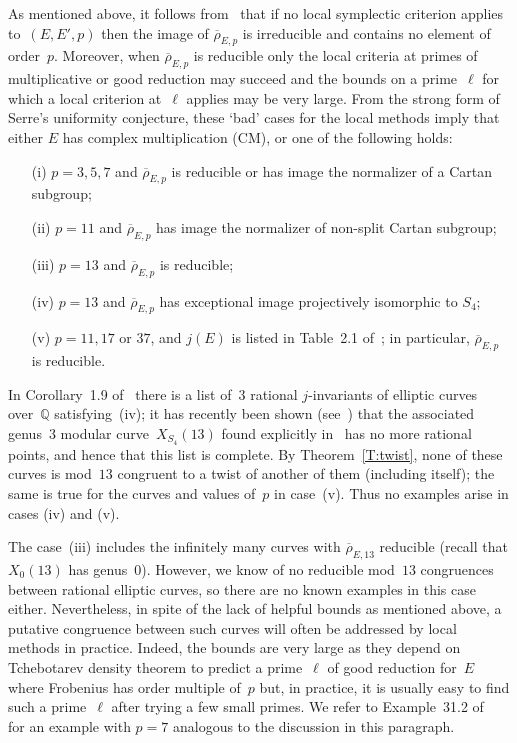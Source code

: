 \documentclass[twoside,leqno,symbols-for-thanks, draft]{rmi}
\numberwithin{equation}{section}
\newcommand{\Q}{\mathbb{Q}}
\newcommand{\rhobar}{{\overline{\rho}}}
\theoremstyle{remark}
\begin{document}
As mentioned above, it follows from~\cite{FKSym} that if no local
symplectic criterion applies to~$(E,E',p)$ then the image of
$\rhobar_{E,p}$ is irreducible and contains no element of
order~$p$. Moreover, when $\rhobar_{E,p}$ is reducible
only the local criteria at primes of multiplicative or good reduction may
succeed and the bounds on a prime~$\ell$ for which a local
criterion at~$\ell$ applies may be very large.  From the
strong form of Serre's uniformity conjecture, these `bad' cases for
the local methods imply that either $E$ has complex multiplication
(CM), or one of the following holds:
\begin{itemize}
 \item[(i)] $p=3,5,7$ and $\rhobar_{E,p}$ is reducible or has image the normalizer of a Cartan subgroup;
 \item[(ii)] $p=11$ and $\rhobar_{E,p}$ has image the normalizer of non-split Cartan subgroup;
 \item[(iii)] $p=13$ and $\rhobar_{E,p}$ is reducible; 
 \item[(iv)] $p=13$ and $\rhobar_{E,p}$ has exceptional image projectively isomorphic to $S_4$;
 \item[(v)] $p=11,17$ or $37$, and $j(E)$ is listed
 in Table~2.1 of~\cite{DahmenPhD}; in particular, $\rhobar_{E,p}$ is reducible.
\end{itemize}
In Corollary~1.9 of~\cite{BarinderCrem} there is a list of~$3$ rational
$j$-invariants of elliptic curves over~$\Q$ satisfying~(iv); it has
recently been shown (see~\cite{BDMTV-S4}) that the associated
genus~$3$ modular curve~$X_{S_4}(13)$ found explicitly
in~\cite{BarinderCrem} has no more rational points, and hence that
this list is complete. By Theorem~\ref{T:twist}, none of these
curves is mod~$13$ congruent to a twist of another of them
(including itself); the same is true for the curves and values of~$p$
in case~(v). Thus no examples arise in cases (iv) and (v).

The case~(iii) includes the infinitely many curves with
$\rhobar_{E,13}$ reducible (recall that $X_0(13)$ has genus~0). However, 
we know of no reducible mod~$13$ congruences between rational elliptic curves, so there are no known examples in this case either. Nevertheless, in spite of the lack of helpful bounds as mentioned above, a putative congruence
between such curves will often be addressed by local methods in
practice. Indeed, the bounds are very large as they depend on
Tchebotarev density theorem to predict a prime~$\ell$ of good
reduction for~$E$ where Frobenius has order multiple of~$p$ but,
in practice, it is usually easy to find such a prime~$\ell$ after
trying a few small primes.
We refer to Example~31.2 of~\cite{FKSym} for
an example with $p=7$ analogous to the discussion in this paragraph.
\end{document}
